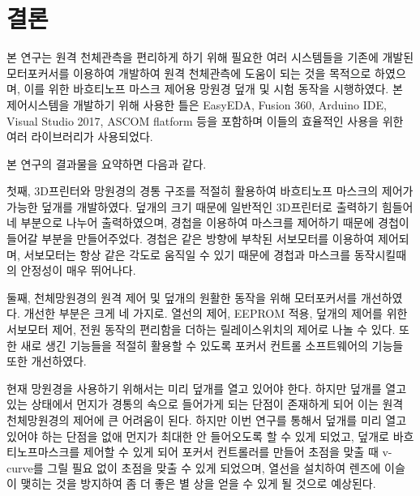 \newpage

\section{결론}
본 연구는 원격 천체관측을 편리하게 하기 위해 필요한 여러 시스템들을 기존에 개발된 모터포커서를 이용하여 개발하여 원격 천체관측에 도움이 되는 것을 목적으로 하였으며, 이를 위한 바흐티노프 마스크 제어용 망원경 덮개 및 시험 동작을 시행하였다. 본 제어시스템을 개발하기 위해 사용한 틀은 EasyEDA, Fusion 360, Arduino IDE, Visual Studio 2017, ASCOM flatform 등을 포함하며 이들의 효율적인 사용을 위한 여러 라이브러리가 사용되었다.

본 연구의 결과물을 요약하면 다음과 같다.


첫째, 3D프린터와 망원경의 경통 구조를 적절히 활용하여 바흐티노프 마스크의 제어가 가능한 덮개를 개발하였다. 덮개의 크기 때문에 일반적인 3D프린터로 출력하기 힘들어 네 부분으로 나누어 출력하였으며, 경첩을 이용하여 마스크를 제어하기 때문에 경첩이 들어갈 부분을 만들어주었다. 경첩은 같은 방향에 부착된 서보모터를 이용하여 제어되며, 서보모터는 항상 같은 각도로 움직일 수 있기 때문에 경첩과 마스크를 동작시킬때의 안정성이 매우 뛰어나다.

둘째, 천체망원경의 원격 제어 및 덮개의 원활한 동작을 위해 모터포커서를 개선하였다. 개선한 부분은 크게 네 가지로. 열선의 제어, EEPROM 적용, 덮개의 제어를 위한 서보모터 제어, 전원 동작의 편리함을 더하는 릴레이스위치의 제어로 나놀 수 있다. 또한 새로 생긴 기능들을 적절히 활용할 수 있도록 포커서 컨트롤 소프트웨어의 기능들 또한 개선하였다.

현재 망원경을 사용하기 위해서는 미리 덮개를 열고 있어야 한다. 하지만 덮개를 열고 있는 상태에서 먼지가 경통의 속으로 들어가게 되는 단점이 존재하게 되어 이는 원격 천체망원경의 제어에 큰 어려움이 된다. 하지만 이번 연구를 통해서 덮개를 미리 열고 있어야 하는 단점을 없애 먼지가 최대한 안 들어오도록 할 수 있게 되었고, 덮개로 바흐티노프마스크를 제어할 수 있게 되어 포커서 컨트롤러를 만들어 초점을 맞출 때 v-curve를 그릴 필요 없이 초점을 맞출 수 있게 되었으며, 열선을 설치하여 렌즈에 이슬이 맺히는 것을 방지하여 좀 더 좋은 별 상을 얻을 수 있게 될 것으로 예상된다.